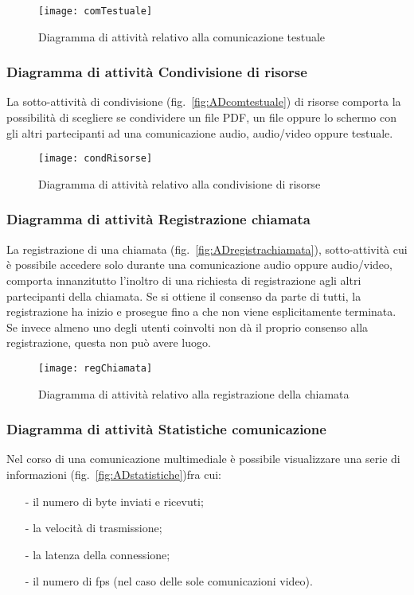 \begin{figure}[H]
  \centering
  \texttt{[image: comTestuale]}
  \caption{Diagramma di attività relativo alla comunicazione testuale}\label{fig:ADcomtestuale}
\end{figure}

\subsubsection{Diagramma di attività Condivisione di risorse}
La sotto-attività di condivisione (fig.~\vref{fig:ADcomtestuale}) di risorse comporta la possibilità di scegliere se condividere un file PDF, un file oppure lo schermo con gli altri partecipanti ad una comunicazione audio, audio/video oppure testuale.

\begin{figure}[H]
  \centering
  \texttt{[image: condRisorse]}
  \caption{Diagramma di attività relativo alla condivisione di risorse}\label{fig:ADcondrisorse}
\end{figure}

\subsubsection{Diagramma di attività Registrazione chiamata}
La registrazione di una chiamata (fig.~\vref{fig:ADregistrachiamata}), sotto-attività cui è possibile accedere solo durante una comunicazione audio oppure audio/video, comporta innanzitutto l'inoltro di una richiesta di registrazione agli altri partecipanti della chiamata. Se si ottiene il consenso da parte di tutti, la registrazione ha inizio e prosegue fino a che non viene esplicitamente terminata. Se invece almeno uno degli utenti coinvolti non dà il proprio consenso alla registrazione, questa non può avere luogo.

\begin{figure}[H]
  \centering
  \texttt{[image: regChiamata]}
  \caption{Diagramma di attività relativo alla registrazione della chiamata}\label{fig:ADregistrachiamata}
\end{figure}

\subsubsection{Diagramma di attività Statistiche comunicazione}
Nel corso di una comunicazione multimediale è possibile visualizzare una serie di informazioni (fig.~\vref{fig:ADstatistiche})fra cui:
\begin{itemize}[noitemsep,nolistsep]
  \item[-] il numero di byte inviati e ricevuti;
  \item[-] la velocità di trasmissione;
  \item[-] la latenza della connessione;
  \item[-] il numero di fps (nel caso delle sole comunicazioni video).
\end{itemize}

